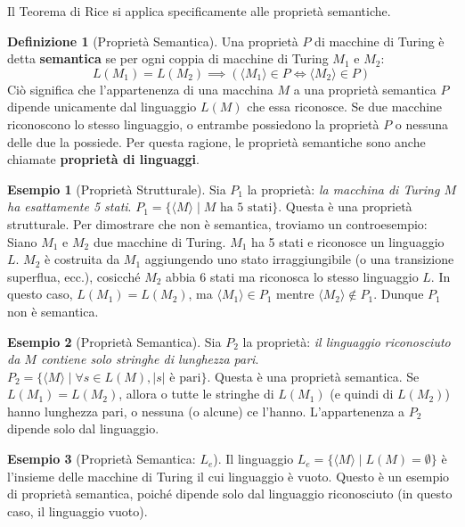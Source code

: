 \documentclass[a4paper]{article}
\theoremstyle{definition} %
\newtheorem{definition}{Definizione}
\newtheorem{example}{Esempio}
\begin{document}
Il Teorema di Rice si applica specificamente alle proprietà semantiche.

\begin{definition}[Proprietà Semantica]
Una proprietà $P$ di macchine di Turing è detta \textbf{semantica} se per ogni coppia di macchine di Turing $M_1$ e $M_2$:
\[ L(M_1) = L(M_2) \implies (\langle M_1 \rangle \in P \iff \langle M_2 \rangle \in P) \]
Ciò significa che l'appartenenza di una macchina $M$ a una proprietà semantica $P$ dipende unicamente dal linguaggio $L(M)$ che essa riconosce. Se due macchine riconoscono lo stesso linguaggio, o entrambe possiedono la proprietà $P$ o nessuna delle due la possiede. Per questa ragione, le proprietà semantiche sono anche chiamate \textbf{proprietà di linguaggi}.
\end{definition}

\begin{example}[Proprietà Strutturale]
Sia $P_1$ la proprietà: \textit{la macchina di Turing $M$ ha esattamente 5 stati}.
$P_1 = \{ \langle M \rangle \mid M \text{ ha 5 stati} \}$.
Questa è una proprietà strutturale. Per dimostrare che non è semantica, troviamo un controesempio:
Siano $M_1$ e $M_2$ due macchine di Turing. $M_1$ ha 5 stati e riconosce un linguaggio $L$. $M_2$ è costruita da $M_1$ aggiungendo uno stato irraggiungibile (o una transizione superflua, ecc.), cosicché $M_2$ abbia 6 stati ma riconosca lo stesso linguaggio $L$. In questo caso, $L(M_1) = L(M_2)$, ma $\langle M_1 \rangle \in P_1$ mentre $\langle M_2 \rangle \notin P_1$. Dunque $P_1$ non è semantica.
\end{example}

\begin{example}[Proprietà Semantica]
Sia $P_2$ la proprietà: \textit{il linguaggio riconosciuto da $M$ contiene solo stringhe di lunghezza pari}.
$P_2 = \{ \langle M \rangle \mid \forall s \in L(M), |s| \text{ è pari} \}$.
Questa è una proprietà semantica. Se $L(M_1) = L(M_2)$, allora o tutte le stringhe di $L(M_1)$ (e quindi di $L(M_2)$) hanno lunghezza pari, o nessuna (o alcune) ce l'hanno. L'appartenenza a $P_2$ dipende solo dal linguaggio.
\end{example}

\begin{example}[Proprietà Semantica: $L_e$]
Il linguaggio $L_e = \{\langle M \rangle \mid L(M) = \emptyset\}$ è l'insieme delle macchine di Turing il cui linguaggio è vuoto. Questo è un esempio di proprietà semantica, poiché dipende solo dal linguaggio riconosciuto (in questo caso, il linguaggio vuoto).
\end{example}
\end{document}
